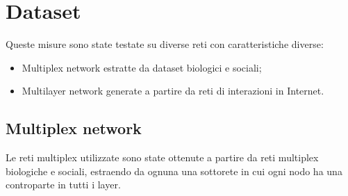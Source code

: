 \chapter{Dataset}
Queste misure sono state testate su diverse reti con caratteristiche diverse:
\begin{itemize}
    \item Multiplex network estratte da dataset biologici e sociali;
    \item Multilayer network generate a partire da reti di interazioni in Internet.
\end{itemize}

\section{Multiplex network}
Le reti multiplex utilizzate sono state ottenute a partire da reti multiplex biologiche e sociali,
estraendo da ognuna una sottorete in cui ogni nodo ha una controparte in tutti i layer.


